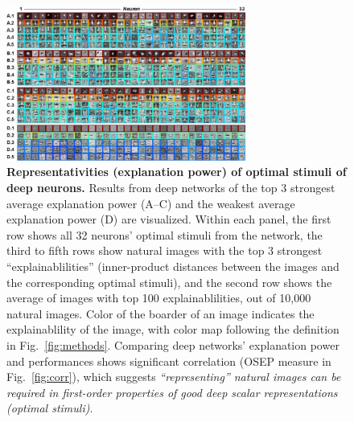 \documentclass[10pt,twocolumn,letterpaper]{article}
\begin{document}
\begin{figure}
\begin{center}
\includegraphics[width=0.70\textwidth]{Figs/pic2.pdf} 
\end{center}
\caption{{\bf Representativities (\ie explanation power) of optimal stimuli of deep neurons.}
Results from deep networks of the top 3 strongest average explanation power (A--C) and the weakest average explanation power (D) are visualized.
Within each panel, the first row shows all 32 neurons' optimal stimuli from the network, the third to fifth rows show natural images with the top 3 strongest ``explainablilities'' (\ie inner-product distances between the images and the corresponding optimal stimuli), and the second row shows the average of images with top 100 explainablilities, out of 10,000 natural images.
Color of the boarder of an image indicates the explainablility of the image, with color map following the definition in Fig.~\ref{fig:methods}.
Comparing deep networks' explanation power and performances shows significant correlation (OSEP measure in Fig.~\ref{fig:corr}), which suggests \emph{``representing'' natural images can be required in first-order properties of good deep scalar representations (\ie optimal stimuli)}.
}
\label{fig:exppow}
\end{figure}
\end{document}

